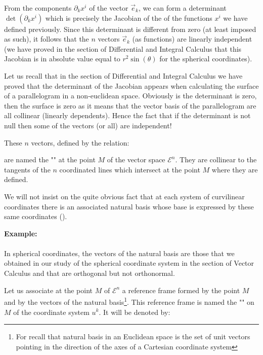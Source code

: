 	From the components $\partial_k x^i$ of the vector $\vec{e}_k$, we can form a determinant $\det(\partial_kx^i)$ which is precisely the Jacobian of the of the functions $x^i$ we have defined previously. Since this determinant is different from zero (at least imposed as such), it follows that the $n$ vectors $\vec{e}_k$ (as functions) are linearly independent (we have proved in the section of Differential and Integral Calculus that this Jacobian is in absolute value equal to $r^2\sin(\theta)$ for the spherical coordinates).
	\begin{tcolorbox}[title=Remark,colframe=black,arc=10pt]
	Let us recall that in the section of Differential and Integral Calculus we have proved that the determinant of the Jacobian appears when calculating the surface of a parallelogram in a non-euclidean space. Obviously is the determinant is zero, then the surface is zero as it means that the vector basis of the parallelogram are all collinear (linearly dependents). Hence the fact that if the determinant is not null then some of the vectors (or all) are independent!
	\end{tcolorbox}
	These $n$ vectors, defined by the relation:
	
	are named the "" at the point $M$ of the vector space $\mathcal{E}^n$. They are collinear to the tangents of the $n$ coordinated lines which intersect at the point $M$ where they are defined.
	
	We will not insist on the quite obvious fact that at each system of curvilinear coordinates there is an associated natural basis whose base is expressed by these same coordinates ().
	\begin{tcolorbox}[colframe=black,colback=white,sharp corners]
	\textbf{{\Large {}}Example:}\\\\
	In spherical coordinates, the vectors of the natural basis are those that we obtained in our study of the spherical coordinate system in the section of Vector Calculus and that are orthogonal but not orthonormal.
	\end{tcolorbox}
	
	Let us associate at the point $M$ of $\mathcal{E}^n$ a reference frame formed by the point $M$ and by the vectors of the natural basis\footnote{For recall that natural basis in an Euclidean space is the set of unit vectors pointing in the direction of the axes of a Cartesian coordinate system}. This reference frame is named the "" on $M$ of the coordinate system $u^k$. It will be denoted by:
	

